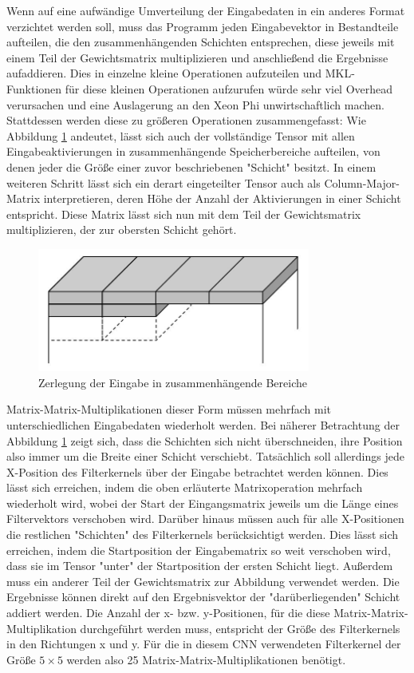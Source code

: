 \documentclass[../main.tex]{subfiles}
\begin{document}
Wenn auf eine aufwändige Umverteilung der Eingabedaten in ein anderes Format verzichtet werden soll, muss das Programm jeden Eingabevektor in Bestandteile aufteilen, die den zusammenhängenden Schichten entsprechen, diese jeweils mit einem Teil der Gewichtsmatrix multiplizieren und anschließend die Ergebnisse aufaddieren. Dies in einzelne kleine Operationen aufzuteilen und MKL-Funktionen für diese kleinen Operationen aufzurufen würde sehr viel Overhead verursachen und eine Auslagerung an den Xeon Phi unwirtschaftlich machen. Stattdessen werden diese zu größeren Operationen zusammengefasst: Wie Abbildung \ref{pic:conv_tensor_tiled} andeutet, lässt sich auch der vollständige Tensor mit allen Eingabeaktivierungen in zusammenhängende Speicherbereiche aufteilen, von denen jeder die Größe einer zuvor beschriebenen "Schicht" besitzt. In einem weiteren Schritt lässt sich ein derart eingeteilter Tensor auch als Column-Major-Matrix interpretieren, deren Höhe der Anzahl der Aktivierungen in einer Schicht entspricht. Diese Matrix lässt sich nun mit dem Teil der Gewichtsmatrix multiplizieren, der zur obersten Schicht gehört. 
\begin{figure}
	\centering 
	\includegraphics[width=0.8\textwidth]{../images/Schmidt/convTensor2.jpg} 
	\caption {Zerlegung der Eingabe in zusammenhängende Bereiche}
	\label{pic:conv_tensor_tiled} 
\end{figure} 
Matrix-Matrix-Multiplikationen dieser Form müssen mehrfach mit unterschiedlichen Eingabedaten wiederholt werden. Bei näherer Betrachtung der Abbildung \ref{pic:conv_tensor_tiled} zeigt sich, dass die Schichten sich nicht überschneiden, ihre Position also immer um die Breite einer Schicht verschiebt. Tatsächlich soll allerdings jede X-Position des Filterkernels über der Eingabe betrachtet werden können. Dies lässt sich erreichen, indem die oben erläuterte Matrixoperation mehrfach wiederholt wird, wobei der Start der Eingangsmatrix jeweils um die Länge eines Filtervektors verschoben wird. Darüber hinaus müssen auch für alle X-Positionen die restlichen "Schichten" des Filterkernels berücksichtigt werden. Dies lässt sich erreichen, indem die Startposition der Eingabematrix so weit verschoben wird, dass sie im Tensor "unter" der Startposition der ersten Schicht liegt. Außerdem muss ein anderer Teil der Gewichtsmatrix zur Abbildung verwendet werden. Die Ergebnisse können direkt auf den Ergebnisvektor der "darüberliegenden" Schicht addiert werden. Die Anzahl der x- bzw. y-Positionen, für die diese Matrix-Matrix-Multiplikation durchgeführt werden muss, entspricht der Größe des Filterkernels in den Richtungen x und y. Für die in diesem CNN verwendeten Filterkernel der Größe \(5\times5\) werden also 25 Matrix-Matrix-Multiplikationen benötigt. 
\end{document}
